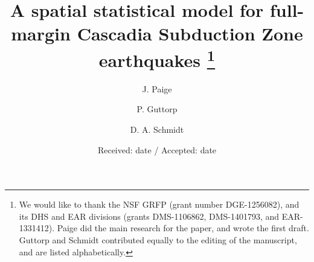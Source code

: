{\newcommand{\vb}{\vec{\beta}}
\newcommand{\vt}{\vec{\theta}}
\newcommand{\htv}{\hat{\vec{\theta}}}
\newcommand{\hbv}{\hat{\vec{\beta}}}
\newcommand{\xtxi}{\paren{\mathbf{X}^T\mathbf{X}}^{-1}}
\newcommand{\xtvixi}{\paren{\mathbf{X}^T\mathbf{V}^{-1} \mathbf{X}}^{-1}}

\newcommand{\image}[2]{\texttt{[image: \#2]}}

\setcounter{MaxMatrixCols}{20}
 
\renewcommand{\exp}{\text{exp}}



\title{A spatial statistical model for full-margin Cascadia Subduction Zone earthquakes \thanks{We would like to thank the NSF GRFP (grant number DGE-1256082), and its DHS and EAR divisions (grants DMS-1106862, DMS-1401793, and EAR-1331412).  Paige did the main research for the paper, and wrote the first draft. Guttorp and Schmidt contributed equally to the editing of the manuscript, and are listed alphabetically.}
}


\author{J. Paige        \and
        P. Guttorp \and
        D. A. Schmidt
}



\date{Received: date / Accepted: date}


}
